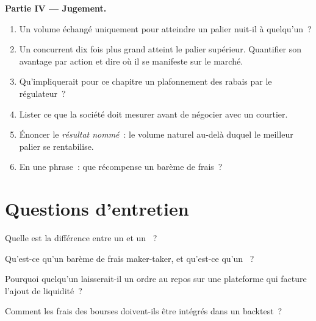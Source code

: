 \begin{problem}
\medskip\noindent\textbf{Partie IV --- Jugement.}
\begin{enumerate}[resume]
\item Un volume échangé uniquement pour atteindre un palier nuit-il à quelqu'un~?
\item Un concurrent dix fois plus grand atteint le palier supérieur. Quantifier son
avantage par action et dire où il se manifeste sur le marché.
\item Qu'impliquerait pour ce chapitre un plafonnement des rabais par le régulateur~?
\item Lister ce que la société doit mesurer avant de négocier avec un courtier.
\item Énoncer le \emph{résultat nommé}~: le volume naturel au-delà duquel le meilleur
palier se rentabilise.
\item En une phrase~: que récompense un barème de frais~?
\end{enumerate}
\end{problem}

\section{Questions d'entretien}

\begin{interviewq}\label{iq:m1:getting-access-equities:1}
Quelle est la différence entre un  et un ~?
\end{interviewq}

\begin{interviewq}\label{iq:m1:getting-access-equities:2}
Qu'est-ce qu'un barème de frais maker-taker, et qu'est-ce qu'un ~?
\end{interviewq}

\begin{interviewq}\label{iq:m1:getting-access-equities:3}
Pourquoi quelqu'un laisserait-il un ordre au repos sur une plateforme qui facture
l'ajout de liquidité~?
\end{interviewq}

\begin{interviewq}\label{iq:m1:getting-access-equities:4}
Comment les frais des bourses doivent-ils être intégrés dans un backtest~?
\end{interviewq}

